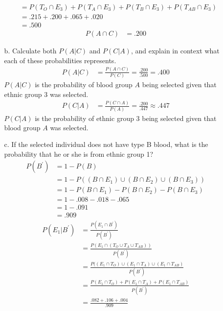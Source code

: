 \documentclass[letterpaper,12pt]{article}
\begin{document}
\begin{enumerate}
\begin{enumerate}
\begin{align*}
          &= P(T_{O} \cap E_3) + P(T_{A} \cap E_3) + P(T_{B} \cap E_3) + P(T_{AB} \cap E_3) \\
          &= .215 + .200 + .065 + .020 \\
          &= .500
        \end{align*}
        \begin{align*}
          P(A \cap C) &= .200
        \end{align*}
      \item[b.]
        Calculate both $P(A|C)$ and $P(C|A)$, and explain in context what each of these probabilities represents.
        \begin{align*}
          P(A|C) &= \frac{P(A \cap C)}{P(C)} = \frac{.200}{.500} = .400
        \end{align*}
        $P(A|C)$ is the probability of blood group $A$ being selected given that ethnic group 3 was selected.
        \begin{align*}
          P(C|A) &= \frac{P(C \cap A)}{P(A)} = \frac{.200}{.447} \approx .447
        \end{align*}
        $P(C|A)$ is the probability of ethnic group 3 being selected given that blood group $A$ was selected.
      \item[c.]
        If the selected individual does not have type B blood, what is the probability that he or she is from ethnic group 1?
        \begin{align*}
          P(B^\prime) &= 1 - P(B) \\
          &= 1 - P((B \cap E_1) \cup (B \cap E_2) \cup (B \cap E_3)) \\
          &= 1 - P(B \cap E_1) - P(B \cap E_2) - P(B \cap E_3) \\
          &= 1 - .008 - .018 - .065 \\
          &= 1 - .091 \\
          &= .909
        \end{align*}
        \begin{align*}
          P(E_1|B^\prime) &= \frac{P(E_1 \cap B^\prime)}{P(B^\prime)} \\
          &= \frac{P(E_1 \cap (T_O \cup T_A \cup T_{AB}))}{P(B^\prime)} \\
          &= \frac{P((E_1 \cap T_O) \cup (E_1 \cap T_A) \cup (E_1 \cap T_{AB})}{P(B^\prime)} \\
          &= \frac{P(E_1 \cap T_O) + P(E_1 \cap T_A) + P(E_1 \cap T_{AB})}{P(B^\prime)} \\
          &= \frac{.082 + .106 + .004}{.909} \\

\end{align*}
\end{enumerate}
\end{enumerate}
\end{document}
